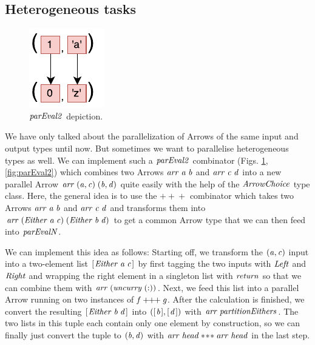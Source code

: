\documentclass[paper=A4,twoside=true,openright,parskip=full,chapterprefix=true,headings=normal,bibliography=totoc,listof=totoc,titlepage=on,captions=tableabove,draft=false,british]{scrreprt}%
\begin{document}
\hypertarget{heterogeneous-tasks}{%
\subsection{Heterogeneous tasks}\label{heterogeneous-tasks}}

\label{sec:hetereogeneoustasks}

\begin{figure}[h]
\centering
\includegraphics{src/img/parEval2Img.pdf}
\caption{\ensuremath{\Varid{parEval2}} depiction.\label{fig:parEval2Img}}
\end{figure}

We have only talked about the parallelization of Arrows of the same
input and output types until now. But sometimes we want to parallelise
heterogeneous types as well. We can implement such a \ensuremath{\Varid{parEval2}}
combinator (Figs. \ref{fig:parEval2Img}, \ref{fig:parEval2}) which
combines two Arrows \ensuremath{\Varid{arr}\;\Varid{a}\;\Varid{b}} and \ensuremath{\Varid{arr}\;\Varid{c}\;\Varid{d}} into a new parallel Arrow
\ensuremath{\Varid{arr}\;(\Varid{a},\Varid{c})\;(\Varid{b},\Varid{d})} quite easily with the help of the \ensuremath{\Conid{ArrowChoice}} type
class. Here, the general idea is to use the \ensuremath{\mathbin{+\!\!+\!\!+}} combinator which takes
two Arrows \ensuremath{\Varid{arr}\;\Varid{a}\;\Varid{b}} and \ensuremath{\Varid{arr}\;\Varid{c}\;\Varid{d}} and transforms them into
\ensuremath{\Varid{arr}\;(\Conid{Either}\;\Varid{a}\;\Varid{c})\;(\Conid{Either}\;\Varid{b}\;\Varid{d})} to get a common Arrow type that we can
then feed into \ensuremath{\Varid{parEvalN}}.

We can implement this idea as follows: Starting off, we transform the
\ensuremath{(\Varid{a},\Varid{c})} input into a two-element list \ensuremath{[\mskip1.5mu \Conid{Either}\;\Varid{a}\;\Varid{c}\mskip1.5mu]} by first tagging
the two inputs with \ensuremath{\Conid{Left}} and \ensuremath{\Conid{Right}} and wrapping the right element in
a singleton list with \ensuremath{\Varid{return}} so that we can combine them with
\ensuremath{\Varid{arr}\;(\Varid{uncurry}\;(\mathbin{:}))}. Next, we feed this list into a parallel Arrow
running on two instances of \ensuremath{\Varid{f}\mathbin{+\!\!+\!\!+}\Varid{g}}. After the calculation is
finished, we convert the resulting \ensuremath{[\mskip1.5mu \Conid{Either}\;\Varid{b}\;\Varid{d}\mskip1.5mu]} into \ensuremath{([\mskip1.5mu \Varid{b}\mskip1.5mu],[\mskip1.5mu \Varid{d}\mskip1.5mu])} with
\ensuremath{\Varid{arr}\;\Varid{partitionEithers}}. The two lists in this tuple each contain only
one element by construction, so we can finally just convert the tuple to
\ensuremath{(\Varid{b},\Varid{d})} with \ensuremath{\Varid{arr}\;\Varid{head}\mathbin{*\!*\!*}\Varid{arr}\;\Varid{head}} in the last step.
\end{document}
